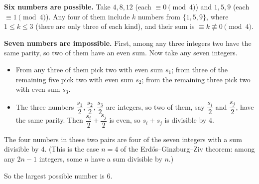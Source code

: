 \textbf{Six numbers are possible.} Take $4,8,12$ (each $\equiv0\pmod4$) and $1,5,9$ (each $\equiv1\pmod4$). Any four of them include $k$ numbers from $\{1,5,9\}$, where $1\le k\le3$ (there are only three of each kind), and their sum is $\equiv k\not\equiv0\pmod4$.

\textbf{Seven numbers are impossible.} First, among any three integers two have the same parity, so two of them have an even sum. Now take any seven integers.
\begin{itemize}
\item From any three of them pick two with even sum $s_1$; from three of the remaining five pick two with even sum $s_2$; from the remaining three pick two with even sum $s_3$.
\item The three numbers $\dfrac{s_1}{2},\dfrac{s_2}{2},\dfrac{s_3}{2}$ are integers, so two of them, say $\dfrac{s_i}{2}$ and $\dfrac{s_j}{2}$, have the same parity. Then $\dfrac{s_i}{2}+\dfrac{s_j}{2}$ is even, so $s_i+s_j$ is divisible by $4$.
\end{itemize}
The four numbers in these two pairs are four of the seven integers with a sum divisible by $4$. (This is the case $n=4$ of the Erd\H{o}s--Ginzburg--Ziv theorem: among any $2n-1$ integers, some $n$ have a sum divisible by $n$.)

So the largest possible number is $\boxed{6}$.
